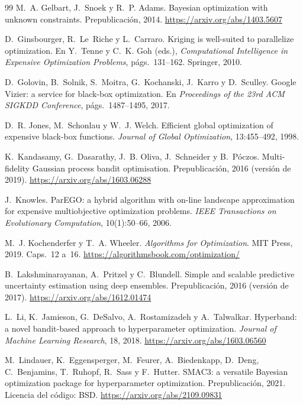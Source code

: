 \begin{thebibliography}{99}
M.~A. Gelbart, J.~Snoek y R.~P. Adams.
\newblock Bayesian optimization with unknown constraints.
\newblock Prepublicación, 2014.
\newblock \url{https://arxiv.org/abs/1403.5607}

D.~Ginsbourger, R.~Le~Riche y L.~Carraro.
\newblock Kriging is well-suited to parallelize optimization.
\newblock En Y.~Tenne y C.~K. Goh (eds.), \emph{Computational Intelligence in Expensive Optimization Problems}, págs.~131--162. Springer, 2010.

D.~Golovin, B.~Solnik, S.~Moitra, G.~Kochanski, J.~Karro y D.~Sculley.
\newblock Google Vizier: a service for black-box optimization.
\newblock En \emph{Proceedings of the 23rd ACM SIGKDD Conference}, págs.~1487--1495, 2017.

D.~R. Jones, M.~Schonlau y W.~J. Welch.
\newblock Efficient global optimization of expensive black-box functions.
\newblock \emph{Journal of Global Optimization}, 13:455--492, 1998.

K.~Kandasamy, G.~Dasarathy, J.~B. Oliva, J.~Schneider y B.~Póczos.
\newblock Multi-fidelity Gaussian process bandit optimisation.
\newblock Prepublicación, 2016 (versión de 2019).
\newblock \url{https://arxiv.org/abs/1603.06288}

J.~Knowles.
\newblock ParEGO: a hybrid algorithm with on-line landscape approximation for expensive multiobjective optimization problems.
\newblock \emph{IEEE Transactions on Evolutionary Computation}, 10(1):50--66, 2006.

M.~J. Kochenderfer y T.~A. Wheeler.
\newblock \emph{Algorithms for Optimization}.
\newblock MIT Press, 2019. Caps.~12 a~16.
\newblock \url{https://algorithmsbook.com/optimization/}

B.~Lakshminarayanan, A.~Pritzel y C.~Blundell.
\newblock Simple and scalable predictive uncertainty estimation using deep ensembles.
\newblock Prepublicación, 2016 (versión de 2017).
\newblock \url{https://arxiv.org/abs/1612.01474}

L.~Li, K.~Jamieson, G.~DeSalvo, A.~Rostamizadeh y A.~Talwalkar.
\newblock Hyperband: a novel bandit-based approach to hyperparameter optimization.
\newblock \emph{Journal of Machine Learning Research}, 18, 2018.
\newblock \url{https://arxiv.org/abs/1603.06560}

M.~Lindauer, K.~Eggensperger, M.~Feurer, A.~Biedenkapp, D.~Deng, C.~Benjamins, T.~Ruhopf, R.~Sass y F.~Hutter.
\newblock SMAC3: a versatile Bayesian optimization package for hyperparameter optimization.
\newblock Prepublicación, 2021. Licencia del código: BSD.
\newblock \url{https://arxiv.org/abs/2109.09831}


\end{thebibliography}
